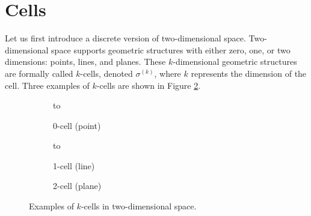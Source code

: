 \section{Cells}

Let us first introduce a discrete version of two-dimensional space. Two-dimensional space supports geometric structures with either zero, one, or two dimensions: points, lines, and planes. These $k$-dimensional geometric structures are formally called $k$-cells, denoted $\sigma^{(k)}$, where $k$ represents the dimension of the cell. Three examples of $k$-cells are shown in Figure \ref{fig:cells}.
\begin{figure}[h]
    \newsavebox\boxCell
    \centering
    \begin{subfigure}[c]{0.3\textwidth}
        \centering
        \vbox to \ht{}
        \caption{0-cell (point)}
    \end{subfigure}
    \begin{subfigure}[c]{0.3\textwidth}
        \centering
        \vbox to \ht{}
        \caption{1-cell (line)}
    \end{subfigure}
    \begin{subfigure}[c]{0.3\textwidth}
        \centering
        \usebox{\boxCell}
        \caption{2-cell (plane)}
        \label{fig:2cell}
    \end{subfigure}
    \caption{Examples of $k$-cells in two-dimensional space.}
    \label{fig:cells}
\end{figure}

